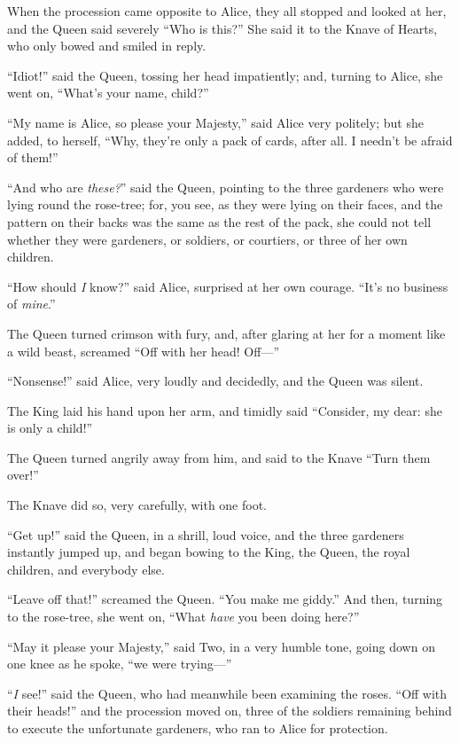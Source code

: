\documentclass[11pt,openany,oneside]{book}
\begin{document}
When the procession came opposite to Alice, they all stopped and looked at her, and the Queen said severely “Who is this?” She said it to the Knave of Hearts, who only bowed and smiled in reply. 

“Idiot!” said the Queen, tossing her head impatiently; and, turning to Alice, she went on, “What’s your name, child?” 

“My name is Alice, so please your Majesty,” said Alice very politely; but she added, to herself, “Why, they’re only a pack of cards, after all. I needn’t be afraid of them!” 

“And who are {\em these?\/}” said the Queen, pointing to the three gardeners who were lying round the rose-tree; for, you see, as they were lying on their faces, and the pattern on their backs was the same as the rest of the pack, she could not tell whether they were gardeners, or soldiers, or courtiers, or three of her own children. 

“How should {\em I\/} know?” said Alice, surprised at her own courage. “It’s no business of {\em mine\/}.” 

The Queen turned crimson with fury, and, after glaring at her for a moment like a wild beast, screamed “Off with her head! Off—” 

“Nonsense!” said Alice, very loudly and decidedly, and the Queen was silent. 

The King laid his hand upon her arm, and timidly said “Consider, my dear: she is only a child!” 

The Queen turned angrily away from him, and said to the Knave “Turn them over!” 

The Knave did so, very carefully, with one foot. 

“Get up!” said the Queen, in a shrill, loud voice, and the three gardeners instantly jumped up, and began bowing to the King, the Queen, the royal children, and everybody else. 

“Leave off that!” screamed the Queen. “You make me giddy.” And then, turning to the rose-tree, she went on, “What {\em have\/} you been doing here?” 

“May it please your Majesty,” said Two, in a very humble tone, going down on one knee as he spoke, “we were trying—” 

“{\em I\/} see!” said the Queen, who had meanwhile been examining the roses. “Off with their heads!” and the procession moved on, three of the soldiers remaining behind to execute the unfortunate gardeners, who ran to Alice for protection. 
\end{document}
